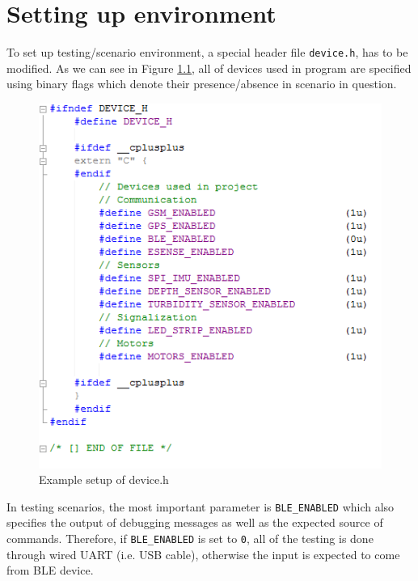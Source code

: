 \chapter{Setting up environment}
\label{ch:env_setup}

To set up testing/scenario environment, a special header file \texttt{device.h}, has to be modified. As we can see in Figure \ref{fig:device_h}, all of devices used in program are specified using binary flags which denote their presence/absence in scenario in question.

\begin{figure}[htb]
    \centering
	  \includegraphics[width=0.7\linewidth]{figures/Environment_setup.png}
	\caption{Example setup of device.h}
	\label{fig:device_h}
\end{figure}

In testing scenarios, the most important parameter is \texttt{BLE\_ENABLED} which also specifies the output of debugging messages as well as the expected source of commands. Therefore, if \texttt{BLE\_ENABLED} is set to \texttt{0}, all of the testing is done through wired UART (i.e. USB cable), otherwise the input is expected to come from BLE device.